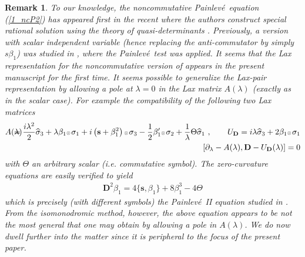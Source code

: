 \documentclass{article}
\def\ss{\mathbf s}
\newtheorem{remark}{Remark}[section]
\def\ot{\hbox{\resizebox{6pt}{!}{$ \otimes \,
$}}}
\def \D{{\mathbf D}}
\def\b{\beta}
\def\br{\begin{remark}}
\def\er{\end{remark}}
\def\s{\sigma}
\def\&{&\hspace{-20pt}}
\def\wh{\widehat}
\def \pa{\partial}
\newcommand{\be}{\begin{eqnarray}}
\newcommand{\ee}{\end{eqnarray}}
\def\le{\left}
\def\ri{\right}
\begin{document}
\br
To our knowledge, the noncommutative Painlev\'e\ equation (\ref{1_ncP2})  has appeared first in the recent \cite{RetakhRubtsov} where the authors construct special rational solution using the theory of quasi-determinants \cite{Gelfand2RetakhWilson}. Previously, a version with scalar independent variable (hence replacing the anti-commutator by simply $s \b_1$) was studied in \cite{BalandinSokolov}, where the Painlev\'e\ test was applied. It seems that the Lax representation for the noncommutative version of \cite{RetakhRubtsov} appears in the present manuscript for the first time. 
It seems possible to generalize the Lax-pair representation by allowing a pole at $\lambda=0$ in the Lax matrix $A(\lambda)$ (exactly as in the scalar case). For example the compatibility of the following two Lax matrices
\be
A(\lambda) &\&= \frac {i\lambda^2}2 \wh \s_3 + \lambda \b_1\ot\s_1 + i\le(\ss+\b_1^2\ri)\ot \s_3- \frac 12 \b_1'\ot \s_2 + \frac 1 \lambda \Theta \wh \s_1\ ,\qquad U_\D= i \lambda \wh \s_3 + 2\b_1 \ot \s_1\\
&\& \le[\pa_\lambda - A(\lambda), \D - U_\D(\lambda)\ri]=0
\ee
with $\Theta$ an arbitrary scalar (i.e. commutative symbol). The zero-curvature equations are easily verified to yield
\be
\D^2 \b_1 = 4 \{\ss, \b_1\} + 8 \b_1^3 - 4 \Theta
\ee
which is precisely (with different symbols) the Painlev\'e\ II equation studied in \cite{RetakhRubtsov}. From the isomonodromic method, however, the above equation appears to be not the most general that one may obtain by allowing a pole in $A(\lambda)$. We do now dwell further into the matter since it is peripheral to the focus of the present paper.
\er
 
\end{document}
